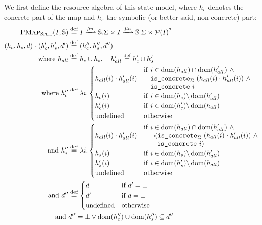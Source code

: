 We first define the resource algebra of this state model, where $h_c$ denotes the concrete part of the map and $h_s$ the symbolic (or better said, non-concrete) part:
\begin{align*}
	\SplitPMap(I,\mmdl) &\defeq I \finmap \mmdl.\Sigma \times I \finmap\mmdl.\Sigma \times \pset(I)^?\\
	(h_c, h_s, d)\cdot (h_c', h_s', d') &\defeq (h_c'', h_s'', d'')\\
	\text{where } h_{all}&\defeq h_c\cup h_s,\quad h_{all}'\defeq h_c'\cup h_s'\\
	\text{where } h_c''&\defeq \lambda i.\begin{cases}
		h_{all}(i)\cdot h_{all}'(i)&\begin{aligned}
			\If~&i\in \dom(h_{all})\cap\dom(h_{all}') ~\land \\
			&\code{is\_concrete}_\St~(h_{all}(i)\cdot h_{all}'(i)) ~\land \\
			&\code{is\_concrete}~i
		\end{aligned}\\
		h_c(i) &\If~i\in \dom(h_c) \backslash \dom(h_{all}')\\
		h_c'(i) &\If~i\in \dom(h_c') \backslash \dom(h_{all})\\
		\text{undefined}&\Otherwise
	\end{cases}\\
	\text{and }h_s'' &\defeq \lambda i.\begin{cases}
		h_{all}(i)\cdot h_{all}'(i)&\begin{aligned}
			\If~&i\in \dom(h_{all})\cap\dom(h_{all}') ~\land \\
			&\neg(\code{is\_concrete}_\St~(h_{all}(i)\cdot h_{all}'(i)) ~\land \\
			&~~~\code{is\_concrete}~i)
		\end{aligned}\\
		h_s(i) &\If~i\in \dom(h_s) \backslash \dom(h_{all}')\\
		h_s'(i) &\If~i\in \dom(h_s') \backslash \dom(h_{all})\\
		\text{undefined}&\Otherwise
	\end{cases}\\
	\text{and }d''&\defeq\begin{cases}
		d&\If~d'=\bot\\
		d'&\If~d=\bot\\
		\text{undefined}&\Otherwise
	\end{cases}\\
	\text{and }& d'' = \bot \lor \dom(h_c'')\cup\dom(h_s'')\subseteq d''\\

\end{align*}
